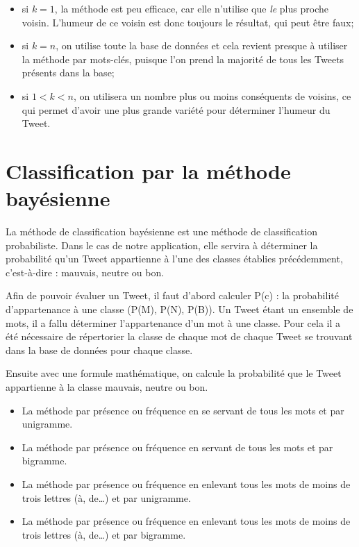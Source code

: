 \documentclass[12pt,a4paper]{report}
\begin{document}
\begin{itemize}
	\item si $k=1$, la méthode est peu efficace, car elle n'utilise que
		\textit{le} plus proche voisin. L'humeur de ce voisin est donc
		toujours le résultat, qui peut être faux;
	\item si $k=n$, on utilise toute la base de données et cela revient presque
		à utiliser la méthode par mots-clés, puisque l'on prend la majorité de
		tous les Tweets présents dans la base;
	\item si $1 < k < n$, on utilisera un nombre plus ou moins conséquents de
		voisins, ce qui permet d'avoir une plus grande variété pour déterminer
		l'humeur du Tweet.
\end{itemize}

\section{Classification par la méthode bayésienne}
\label{classification_bayesienne}
La méthode de classification bayésienne est une méthode de classification
probabiliste. Dans le cas de notre application, elle servira à déterminer la
probabilité qu'un Tweet appartienne à l'une des classes établies précédemment,
c'est-à-dire : mauvais, neutre ou bon.

Afin de pouvoir évaluer un Tweet, il faut d'abord calculer P(c) : la probabilité
d'appartenance à une classe (P(M), P(N), P(B)).
Un Tweet étant un ensemble de mots, il a fallu déterminer l'appartenance d'un
mot à une classe. Pour cela il a été nécessaire de répertorier la classe de
chaque mot de chaque Tweet se trouvant dans la base de données pour chaque
classe.

Ensuite avec une formule mathématique, on calcule la probabilité que le Tweet
appartienne à la classe mauvais, neutre ou bon.

\begin{itemize}
	\item
		La méthode par présence ou fréquence en se servant de tous les mots et
		par unigramme.
	\item
		La méthode par présence ou fréquence en servant de tous les mots et par
		bigramme.
	\item
		La méthode par présence ou fréquence en enlevant tous les mots de moins
		de trois lettres (à, de…) et par unigramme.
	\item
		La méthode par présence ou fréquence en enlevant tous les mots de moins
		de trois lettres (à, de…) et par bigramme.
\end{itemize}
\end{document}

